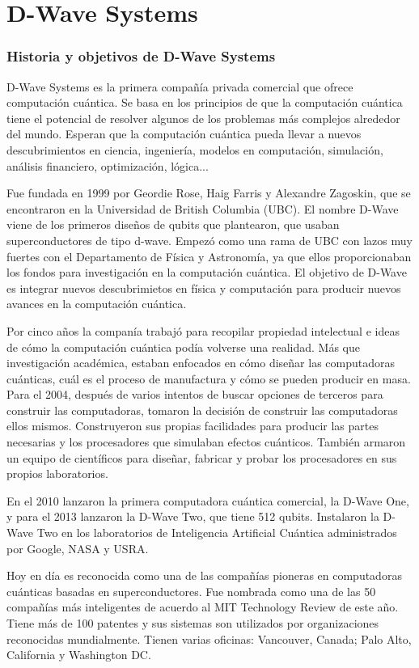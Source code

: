 \documentclass[11pt,a4paper]{article}
\begin{document}
\part{D-Wave Systems}
\section*{Historia y objetivos de D-Wave Systems}

D-Wave Systems es la primera compañía privada comercial que ofrece computación cuántica. Se basa en los principios de que la computación cuántica tiene el potencial de resolver algunos de los problemas más complejos alrededor del mundo. Esperan que la computación cuántica pueda llevar a nuevos descubrimientos en ciencia, ingeniería, modelos en computación, simulación, análisis financiero, optimización, lógica...

Fue fundada en 1999 por Geordie Rose, Haig Farris y Alexandre Zagoskin, que se encontraron en la Universidad de British Columbia (UBC). El nombre D-Wave viene de los primeros diseños de qubits que plantearon, que usaban superconductores de tipo d-wave. Empezó como una rama de UBC con lazos muy fuertes con el Departamento de Física y Astronomía, ya que ellos proporcionaban los fondos para investigación en la computación cuántica. El objetivo de D-Wave es integrar nuevos descubrimietos en física y computación para producir nuevos avances en la computación cuántica.

Por cinco años la companía trabajó para recopilar propiedad intelectual e ideas de cómo la computación cuántica podía volverse una realidad. Más que investigación académica, estaban enfocados en cómo diseñar las computadoras cuánticas, cuál es el proceso de manufactura y cómo se pueden producir en masa. 
Para el 2004, después de varios intentos de buscar opciones de terceros para construir las computadoras, tomaron la decisión de construir las computadoras ellos mismos. Construyeron sus propias facilidades para producir las partes necesarias y los procesadores que simulaban efectos cuánticos. También armaron un equipo de científicos para diseñar, fabricar y probar los procesadores en sus propios laboratorios. 

En el 2010 lanzaron la primera computadora cuántica comercial, la D-Wave One, y para el 2013 lanzaron la D-Wave Two, que tiene 512 qubits. Instalaron la D-Wave Two en los laboratorios de Inteligencia Artificial Cuántica administrados por Google, NASA y USRA. 

Hoy en día es reconocida como una de las compañías pioneras en computadoras cuánticas basadas en superconductores. Fue nombrada como una de las 50 compañías más inteligentes de acuerdo al MIT Technology Review de este año. Tiene más de 100 patentes y sus sistemas son utilizados por organizaciones reconocidas mundialmente. Tienen varias oficinas: Vancouver, Canada; Palo Alto, California y Washington DC. 
\end{document}
